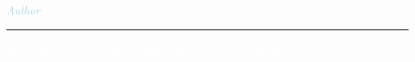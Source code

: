 \begin{titlepage}
\vspace{0.5cm}

{\normalsize \textcolor{lightblue}{\textit{Author}}}

\vspace*{\fill}

\textcolor{accent}{\rule{12cm}{1pt}}

\vspace{0.5cm}

{\small \textcolor{white}{
    \textit{A Comprehensive Guide to Algorithmic Problem Solving}
}}

\vspace{1cm}

\end{titlepage}
